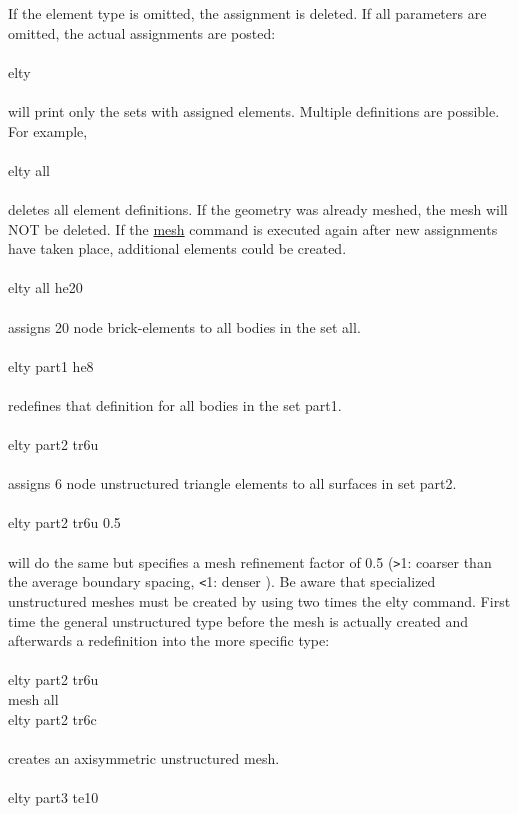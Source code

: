 \documentclass{article}
\providecommand{\htmlref}[2]{\hyperref[#2]{#1}}
\begin{document}
If the element type is omitted, the assignment is deleted. If all parameters are 
omitted, the actual assignments are posted:\\\\
elty\\\\
will print only the sets with assigned elements. Multiple definitions are possible. For example,\\\\
elty all\\\\
deletes all element definitions. If the geometry was already meshed, the mesh will NOT be deleted. If the \htmlref{mesh}{mesh} command is executed again after new assignments have taken place, additional elements could be created.\\\\
elty all he20\\\\
assigns 20 node brick-elements to all bodies in the set all.\\\\
elty part1 he8\\\\
redefines that definition for all bodies in the set part1.\\\\
elty part2 tr6u\\\\
assigns 6 node unstructured triangle elements to all surfaces in set part2.\\\\
elty part2 tr6u 0.5\\\\
will do the same but specifies a mesh refinement factor of 0.5 (\verb_>_1: coarser than the average boundary spacing, \verb_<_1: denser ). Be aware that specialized unstructured meshes must be created by using two times the elty command. First time the general unstructured type before the mesh is actually created and afterwards a redefinition into the more specific type:\\\\
elty part2 tr6u\\
mesh all\\
elty part2 tr6c\\\\
creates an axisymmetric unstructured mesh.\\\\
elty part3 te10\\\\
\end{document}
